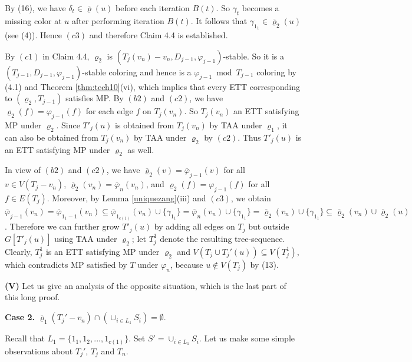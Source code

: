 \documentclass[11pt]{article}
\newcommand{\phibar}{\overline{\varphi}}
\newcommand{\phiv}{\varphi}
\begin{document}
By (16), we have $\delta_t \in \overline{\varrho}(u)$ before each iteration $B(t)$. So $\gamma_t$ becomes a 
missing color at $u$ after performing iteration $B(t)$. It follows that $\gamma_{1_1}\in \overline{\varrho}_2 (u)$ (see (4)).
Hence $(c3)$ and therefore Claim 4.4 is established.  

\vskip 2mm

By $(c1)$ in Claim 4.4, $\varrho_2$ is $(T_j(v_n)-v_n,D_{j-1}, \varphi_{j-1})$-stable. So it is a $(T_{j-1},D_{j-1},\varphi_{j-1})$-stable coloring and hence is a
$\phiv_{j-1}\bmod T_{j-1}$ coloring by (4.1) and Theorem \ref{thm:tech10}(vi), which implies that every ETT corresponding to $(\varrho_2, T_{j-1})$ satisfies MP. 
By $(b2)$ and $(c2)$, we have $\varrho_2(f)=\varphi_{j-1}(f)$ for each edge $f$ on $T_j(v_n)$. So $T_j(v_n)$ an ETT satisfying MP under $\varrho_2$. Since 
$T'_j(u)$ is obtained from $T_j(v_n)$ by TAA under $\varrho_1$, it can also be obtained from $T_j(v_n)$ by TAA under $\varrho_2$ by $(c2)$. Thus $T'_j(u)$ 
is an ETT satisfying MP under $\varrho_2$ as well. 

In view of $(b2)$ and $(c2)$, we have $\overline{\varrho}_2(v)=\phibar_{j-1}(v)$ for all $v\in V(T_j-v_n)$, $\overline{\varrho}_2(v_n)=
\overline{\varphi}_{n}(v_n)$, and $\varrho_2 (f)=\varphi_{j-1}(f)$ for all $f\in E(T_j)$. Moreover, by Lemma \ref{uniquezang}(iii) and $(c3)$, 
we obtain $\overline{\varphi}_{j-1}(v_n) =\overline{\varphi}_{1_1-1}(v_n)  \subseteq \overline{\varphi}_{1_{c(1)}}(v_n) \cup \{\gamma_{1_1}\} = 
\overline{\varphi}_{n}(v_n) \cup \{\gamma_{1_1}\}=\overline{\varrho}_2(v_n) \cup \{\gamma_{1_1}\} \subseteq \overline{\varrho}_2(v_n) \cup 
\overline{\varrho}_2(u)$. Therefore we can further grow $T'_j(u)$ by adding all edges on $T_j$ but outside $G[T'_j(u)]$ using TAA under 
$\varrho_2$; let $T_j^1$ denote the resulting tree-sequence. Clearly, $T_j^1$ is an ETT satisfying MP under $\varrho_2$ and $V(T_j \cup T_j'(u))
\subseteq V(T_j^1)$, which contradicts MP satisfied by $T$ under $\varphi_n$, because $u \notin V(T_j)$ by (13).

\vskip 2mm

{\bf (V)} Let us give an analysis of the opposite situation, which is the last part of this long proof.
 
\vskip 1mm
{\bf Case 2.} $\overline{\varrho}_1(T_j'-v_n)\cap (\cup_{i\in L_1}S_i)= \emptyset$.

\vskip 1mm

Recall that $L_1=\{1_1,1_2,...,1_{c(1)}\}$. Set $S'=\cup_{i\in L_1}S_i$. Let us make some simple observations about
$T_j'$, $T_j$ and $T_n$.
\end{document}

